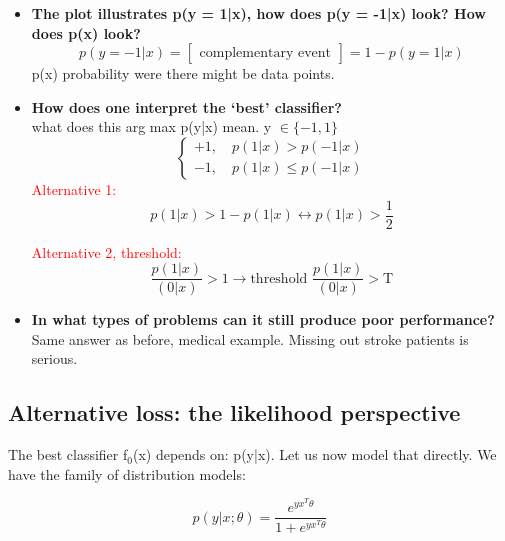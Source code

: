 \begin{itemize}
	\item \textbf{The plot illustrates p(y = 1|x), how does p(y = -1|x) look?
How does p(x) look?} \\
 \begin{equation}
    p(y =-1|x) = \begin{bmatrix} \text{complementary event} \end{bmatrix} = 1 - p(y=1 |x)
  \end{equation}
p(x) probability were there might be data points. 

\item \textbf{How does one interpret the ‘best’ classifier?}\\
what does this arg max p(y|x) mean. y $\in \{-1,1 \}$ 
\begin{equation}
\begin{cases}
+1, \quad p(1 |x) > p(-1 |x) \\
-1, \quad p(1 | x) \le p(-1 |x)
\end{cases} 
\end{equation}
\textcolor{red}{Alternative 1:}  
\begin{equation}
p(1 |x) > 1 - p(1 |x) \leftrightarrow p(1 | x) > \frac{1} {2}  
\end{equation}

\textcolor{red}{Alternative 2, threshold:}  
\begin{equation}
\frac{p(1 |x)} {(0 |x)} > 1 \rightarrow \text{threshold } \frac{p(1 |x)} {(0 |x)} > \text{T}   
\end{equation}

\item \textbf{In what types of problems can it still produce poor
performance?}\\ 
Same answer as before, medical example. Missing out stroke patients is serious. 

\end{itemize}
%

\subsection*{Alternative loss: the likelihood perspective}
The best classifier f$_0$(x) depends on: p(y|x). Let us now model that directly. We have the family of distribution models: 

\begin{equation}
p(y|x;\theta) = \frac{e^{yx^{T}\theta}} {1 + e^{yx^{T}\theta}}
\end{equation}

